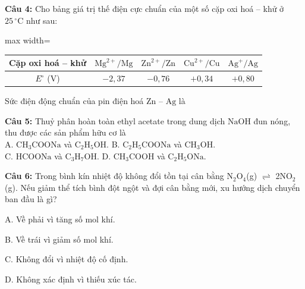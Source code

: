 \documentclass[12pt,a4paper]{article}
\begin{document}
\par\noindent\begin{minipage}{\linewidth}
\noindent \textbf{Câu 4:} Cho bảng giá trị thế điện cực chuẩn của một số cặp oxi hoá -- khử ở $25\,^{\circ}\text{C}$ như sau:\\
\begin{center}
\begin{adjustbox}{max width=\linewidth}
\begin{tabular}{|c|c|c|c|c|}
\hline
Cặp oxi hoá -- khử & $\text{Mg}^{2+}/\text{Mg}$ & $\text{Zn}^{2+}/\text{Zn}$ & $\text{Cu}^{2+}/\text{Cu}$ & $\text{Ag}^{+}/\text{Ag}$ \\
\hline
$E^{\circ}$ (V) & $-2{,}37$ & $-0{,}76$ & $+0{,}34$ & $+0{,}80$ \\
\hline
\end{tabular}
\end{adjustbox}
\end{center}
Sức điện động chuẩn của pin điện hoá $\text{Zn}$ -- $\text{Ag}$ là\\
\noindent{}
\end{minipage}\par\vspace{0.12cm}

\par\noindent\begin{minipage}{\linewidth}
\noindent \textbf{Câu 5:} Thuỷ phân hoàn toàn ethyl acetate trong dung dịch $\text{NaOH}$ đun nóng, thu được các sản phẩm hữu cơ là\\
\noindent A. $\text{CH}_3\text{COONa}$ và $\text{C}_2\text{H}_5\text{OH}$. \hfill B. $\text{C}_2\text{H}_5\text{COONa}$ và $\text{CH}_3\text{OH}$.\\
\noindent C. $\text{HCOONa}$ và $\text{C}_3\text{H}_7\text{OH}$. \hfill D. $\text{CH}_3\text{COOH}$ và $\text{C}_2\text{H}_5\text{ONa}$.\\
\end{minipage}\par\vspace{0.12cm}

\par\noindent\begin{minipage}{\linewidth}
\noindent\textbf{Câu 6:} Trong bình kín nhiệt độ không đổi tồn tại cân bằng N$_{2}$O$_{4}$(g) \(\rightleftharpoons\) 2NO$_{2}$(g). Nếu giảm thể tích bình đột ngột và đợi cân bằng mới, xu hướng dịch chuyển ban đầu là gì?\par
\noindent A. Về phải vì tăng số mol khí.\par
\noindent B. Về trái vì giảm số mol khí.\par
\noindent C. Không đổi vì nhiệt độ cố định.\par
\noindent D. Không xác định vì thiếu xúc tác.\par
\end{minipage}\par\vspace{0.12cm}
\end{document}
